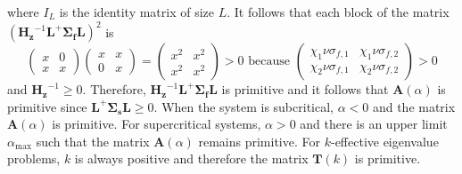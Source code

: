 where $I_{L}$ is the identity matrix of size $L$. It follows that each block of the matrix $(\mathbf{H_{z}}^{-1}\mathbf{L}^{+}  \mathbf{\Sigma_{f}} \mathbf{L})^{2}$ is
\begin{equation}
	\begin{pmatrix}
		x & 0 \\ x & x
	\end{pmatrix}
\begin{pmatrix}
		x & x \\ 0 & x
	\end{pmatrix} =
\begin{pmatrix}
		x^2 & x^2 \\ x^2 & x^{2}
	\end{pmatrix} > 0 \text{ because }
\begin{pmatrix}
	\chi_{1} \nu\sigma_{f,1} & \chi_{1}\nu\sigma_{f,2} \\ \chi_{2}\nu\sigma_{f,1} & \chi_{2}\nu\sigma_{f,2}
	\end{pmatrix} > 0
\end{equation}
and $\mathbf{H_{z}}^{-1} \geq 0$. Therefore, $\mathbf{H_{z}}^{-1} \mathbf{L}^{+}  \mathbf{\Sigma_{f}} \mathbf{L}$ is primitive and it follows that $\mathbf{A}(\alpha)$ is primitive since $\mathbf{L}^{+}  \mathbf{\Sigma_{s}} \mathbf{L} \geq 0$. When the system is subcritical, $\alpha < 0$ and the matrix $\mathbf{A}(\alpha)$ is primitive. For supercritical systems, $\alpha > 0$ and there is an upper limit $\alpha_{\text{max}}$ such that the matrix $\mathbf{A}(\alpha)$ remains primitive. For $k$-effective eigenvalue problems, $k$ is always positive and therefore the matrix $\mathbf{T}(k)$ is primitive.

